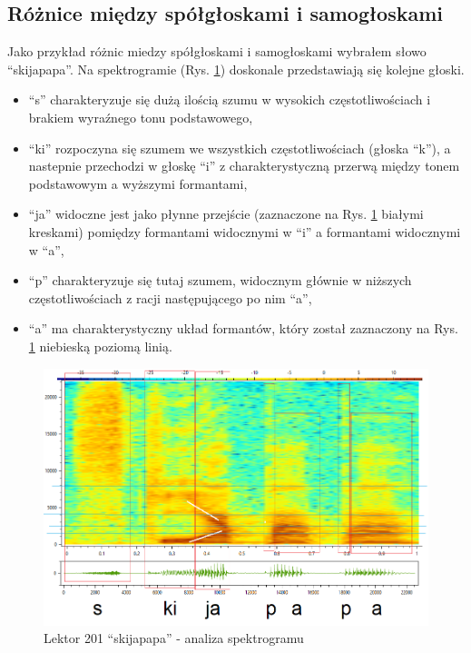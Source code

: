 \documentclass[12pt,a4paper]{article}
\begin{document}
    \subsection{Różnice między spółgłoskami i samogłoskami}
        Jako przykład różnic miedzy spółgłoskami i samogłoskami wybrałem słowo ``skijapapa''. Na spektrogramie (Rys. \ref{fig:skijapapa_201_analiza}) doskonale przedstawiają się kolejne głoski.

        \begin{itemize}
            \item ``s'' charakteryzuje się dużą ilością szumu w wysokich częstotliwościach i brakiem wyraźnego tonu podstawowego,
            \item ``ki'' rozpoczyna się szumem we wszystkich częstotliwościach (głoska ``k''), a nastepnie przechodzi w głoskę ``i'' z charakterystyczną przerwą między tonem podstawowym a wyższymi formantami,
            \item ``ja'' widoczne jest jako płynne przejście (zaznaczone na Rys. \ref{fig:skijapapa_201_analiza} białymi kreskami) pomiędzy formantami widocznymi w ``i'' a formantami widocznymi w ``a'',
            \item ``p'' charakteryzuje się tutaj szumem, widocznym głównie w niższych częstotliwościach z racji następującego po nim ``a'',
            \item ``a'' ma charakterystyczny układ formantów, który został zaznaczony na Rys. \ref{fig:skijapapa_201_analiza} niebieską poziomą linią.
        \end{itemize}

        \begin{figure}[h!]
            \centering
            \includegraphics[width=1.0\textwidth]{figures/skijapapa_201_analiza.png}
            \caption{Lektor 201 ``skijapapa'' - analiza spektrogramu}
            \label{fig:skijapapa_201_analiza}
        \end{figure}
\end{document}
